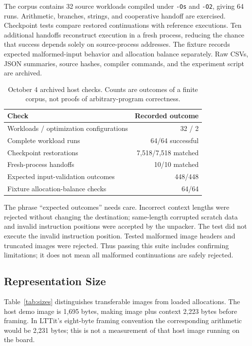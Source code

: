 \documentclass[conference,letterpaper]{IEEEtran}
\begin{document}
The corpus contains 32 source workloads compiled under \texttt{-Os} and \texttt{-O2}, giving 64 runs. Arithmetic, branches, strings, and cooperative handoff are exercised. Checkpoint tests compare restored continuations with reference executions. Ten additional handoffs reconstruct execution in a fresh process, reducing the chance that success depends solely on source-process addresses. The fixture records expected malformed-input behavior and allocation balance separately. Raw CSVs, JSON summaries, source hashes, compiler commands, and the experiment script are archived.

\begin{table}[t]
\caption{October 4 archived host checks. Counts are outcomes of a finite corpus, not proofs of arbitrary-program correctness.}
\centering\small
\begin{tabular}{lr}
\toprule
Check & Recorded outcome\\\midrule
Workloads / optimization configurations & 32 / 2\\
Complete workload runs & 64/64 successful\\
Checkpoint restorations & 7,518/7,518 matched\\
Fresh-process handoffs & 10/10 matched\\
Expected input-validation outcomes & 448/448\\
Fixture allocation-balance checks & 64/64\\\bottomrule
\end{tabular}
\end{table}

The phrase ``expected outcomes'' needs care. Incorrect context lengths were rejected without changing the destination; same-length corrupted scratch data and invalid instruction positions were accepted by the unpacker. The test did not execute the invalid instruction position. Tested malformed image headers and truncated images were rejected. Thus passing this suite includes confirming limitations; it does not mean all malformed continuations are safely rejected.

\subsection{Representation Size}
Table~\ref{tab:sizes} distinguishes transferable images from loaded allocations. The host demo image is 1,695 bytes, making image plus context 2,223 bytes before framing. In LTTit's eight-byte framing convention the corresponding arithmetic would be 2,231 bytes; this is not a measurement of that host image running on the board.
\end{document}
